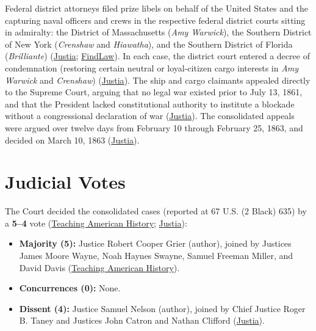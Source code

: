 \documentclass[12pt]{article}
\begin{document}
Federal district attorneys filed prize libels on behalf of the United States and the capturing naval officers and crews in the respective federal district courts sitting in admiralty: the District of Massachusetts (\textit{Amy Warwick}), the Southern District of New York (\textit{Crenshaw} and \textit{Hiawatha}), and the Southern District of Florida (\textit{Brilliante}) (\href{https://supreme.justia.com/cases/federal/us/67/635/}{Justia}; \href{https://caselaw.findlaw.com/court/us-supreme-court/67/635.html}{FindLaw}). In each case, the district court entered a decree of condemnation (restoring certain neutral or loyal-citizen cargo interests in \textit{Amy Warwick} and \textit{Crenshaw}) (\href{https://supreme.justia.com/cases/federal/us/67/635/}{Justia}). The ship and cargo claimants appealed directly to the Supreme Court, arguing that no legal war existed prior to July 13, 1861, and that the President lacked constitutional authority to institute a blockade without a congressional declaration of war (\href{https://supreme.justia.com/cases/federal/us/67/635/}{Justia}). The consolidated appeals were argued over twelve days from February 10 through February 25, 1863, and decided on March 10, 1863 (\href{https://supreme.justia.com/cases/federal/us/67/635/}{Justia}).

\section{Judicial Votes}

The Court decided the consolidated cases (reported at 67 U.S. (2 Black) 635) by a \textbf{5--4} vote (\href{https://teachingamericanhistory.org/document/the-prize-cases/}{Teaching American History}; \href{https://supreme.justia.com/cases/federal/us/67/635/}{Justia}):
\begin{itemize}
\item \textbf{Majority (5):} Justice Robert Cooper Grier (author), joined by Justices James Moore Wayne, Noah Haynes Swayne, Samuel Freeman Miller, and David Davis (\href{https://teachingamericanhistory.org/document/the-prize-cases/}{Teaching American History}).
\item \textbf{Concurrences (0):} None.
\item \textbf{Dissent (4):} Justice Samuel Nelson (author), joined by Chief Justice Roger B. Taney and Justices John Catron and Nathan Clifford (\href{https://supreme.justia.com/cases/federal/us/67/635/}{Justia}).
\end{itemize}
\end{document}

